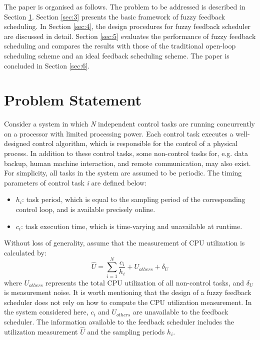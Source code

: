 \documentclass[12pt,a4paper]{ijicic}
\begin{document}
The paper is organised as follows. The problem to be addressed is
described in Section \ref{sec:2}. Section \ref{sec:3} presents the basic framework of
fuzzy feedback scheduling. In Section \ref{sec:4}, the design procedures for
fuzzy feedback scheduler are discussed in detail. Section \ref{sec:5}
evaluates the performance of fuzzy feedback scheduling and compares
the results with those of the traditional open-loop scheduling
scheme and an ideal feedback scheduling scheme. The paper is
concluded in Section \ref{sec:6}.

\section{Problem Statement}
\label{sec:2}

Consider a system in which \emph{N} independent control tasks are
running concurrently on a processor with limited processing power.
Each control task executes a well-designed control algorithm, which
is responsible for the control of a physical process. In addition to
these control tasks, some non-control tasks for, e.g. data backup,
human machine interaction, and remote communication, may also
exist. For simplicity, all tasks in the system are assumed to be
periodic. The timing parameters of control task \emph{i} are defined
below:
\begin{itemize}
\item $h_i$: task period, which is equal to the sampling period of the
corresponding control loop, and is available precisely online.
\item $c_i$: task execution time, which is time-varying and unavailable at runtime.
\end{itemize}

Without loss of generality, assume that the measurement of CPU
utilization is calculated by:
\begin{equation}
\label{equ:1}
\hat{U}=\sum^N_{i=1}\frac{c_i}{h_i}+U_{others}+\delta_U
\end{equation}
where $U_{others}$ represents the total CPU utilization of all
non-control tasks, and $\delta_U$ is measurement noise. It is worth
mentioning that the design of a fuzzy feedback scheduler does not
rely on how to compute the CPU utilization measurement. In the
system considered here, $c_i$ and $U_{others}$ are unavailable to
the feedback scheduler. The information available to the feedback
scheduler includes the utilization measurement $\hat{U}$ and the
sampling periods $h_i$.
\end{document}
